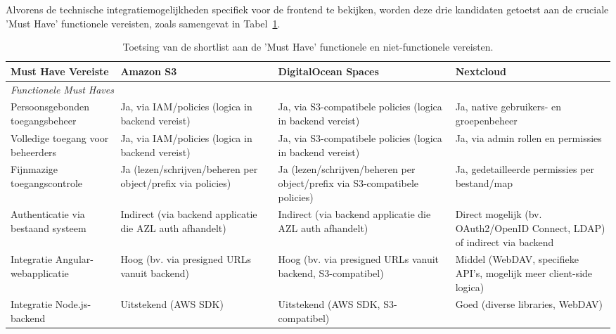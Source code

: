 Alvorens de technische integratiemogelijkheden specifiek voor de frontend te bekijken, worden deze drie kandidaten getoetst aan de cruciale 'Must Have' functionele vereisten, zoals samengevat in Tabel~\ref{tab:musthave-vergelijking}.


\begin{table}[htbp]
    \centering
    \scriptsize %
    \setlength{\tabcolsep}{4pt} %
    \renewcommand{\arraystretch}{0.9} %
    \caption[Toetsing shortlist aan Must Have vereisten]{\label{tab:musthave-vergelijking}Toetsing van de shortlist aan de 'Must Have' functionele en niet-functionele vereisten.}
    \begin{tabularx}{\textwidth}{l >{\raggedright\arraybackslash}X >{\raggedright\arraybackslash}X >{\raggedright\arraybackslash}X}
      \toprule
      \textbf{Must Have Vereiste} & \textbf{Amazon S3} & \textbf{DigitalOcean Spaces} & \textbf{Nextcloud} \\
      \midrule
      \multicolumn{4}{l}{\textit{Functionele Must Haves}} \\
      Persoonsgebonden toegangsbeheer & Ja, via IAM/policies (logica in backend vereist) & Ja, via S3-compatibele policies (logica in backend vereist) & Ja, native gebruikers- en groepenbeheer \\
      \midrule
      Volledige toegang voor beheerders & Ja, via IAM/policies (logica in backend vereist) & Ja, via S3-compatibele policies (logica in backend vereist) & Ja, via admin rollen en permissies \\
      \midrule
      Fijnmazige toegangscontrole & Ja (lezen/schrijven/beheren per object/prefix via policies) & Ja (lezen/schrijven/beheren per object/prefix via S3-compatibele policies) & Ja, gedetailleerde permissies per bestand/map \\
      \midrule
      Authenticatie via bestaand systeem & Indirect (via backend applicatie die AZL auth afhandelt) & Indirect (via backend applicatie die AZL auth afhandelt) & Direct mogelijk (bv. OAuth2/OpenID Connect, LDAP) of indirect via backend \\
      \midrule
      Integratie Angular-webapplicatie & Hoog (bv. via presigned URLs vanuit backend) & Hoog (bv. via presigned URLs vanuit backend, S3-compatibel) & Middel (WebDAV, specifieke API's, mogelijk meer client-side logica) \\
      \midrule
      Integratie Node.js-backend & Uitstekend (AWS SDK) & Uitstekend (AWS SDK, S3-compatibel) & Goed (diverse libraries, WebDAV) \\

\end{tabularx}
\end{table}
